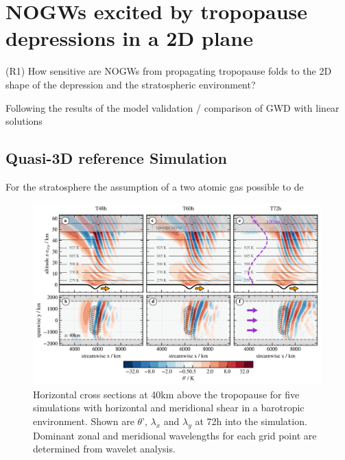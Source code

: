 \chapter{NOGWs excited by tropopause depressions in a 2D plane}
\label{sec:resultsQ3D}

\begin{tcolorbox}[]
    (R1) How sensitive are NOGWs from propagating tropopause folds to the 2D shape of the depression and the stratospheric environment?
\end{tcolorbox}


Following the results of the model validation / comparison of GWD with linear solutions




\section{Quasi-3D reference Simulation}
\label{sec:resultsq3D-reference}


For the stratosphere the assumption of a two atomic gas  possible to de


\begin{figure}[tbp]
    \centering
    \includegraphics[width=0.99\textwidth]{figures_q3D/Q3D-th-referenceSim.png}
    \caption{Horizontal cross sections at 40km above the tropopause for five simulations with horizontal and meridional shear in a barotropic environment. Shown are $\theta$', $\lambda_x$ and $\lambda_y$ at 72h into the simulation. Dominant zonal and meridional wavelengths for each grid point are determined from wavelet analysis.}
    \label{fig:q3D_referenceSim}
\end{figure}

